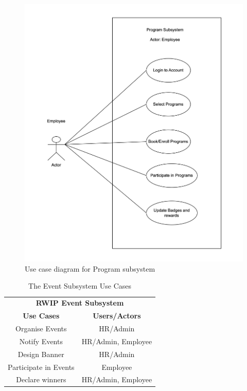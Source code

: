 \begin{figure}[h!t]
    \centering
    \includegraphics[width=\textwidth]{images/ucProgram.png}
    \caption{Use case diagram for Program subsystem}
    \label{fig:ucProgram}
\end{figure}


\begin{table}[h!t]
\caption{The Event Subsystem Use Cases}
{%
\newcommand{\mc}[2]{\multicolumn{#1}{#2}}
\begin{center}
\begin{tabular}{|c|c|}
\hline
\multicolumn{2}{|c|}{\textbf{RWIP Event Subsystem}} \\ \cline{1-2}
\textbf{Use Cases} & \textbf{Users/Actors} \\
\hline
\rule{0pt}{24pt}  Organise Events & HR/Admin \\
\hline
\rule{0pt}{24pt}  Notify Events & HR/Admin, Employee \\
\hline
\rule{0pt}{24pt}  Design Banner & HR/Admin \\
\hline
\rule{0pt}{24pt}  Participate in Events & Employee \\
\hline
\rule{0pt}{24pt}  Declare winners & HR/Admin, Employee \\
\hline
\end{tabular}
\end{center}
}%
\label{tab:event}
\end{table}

